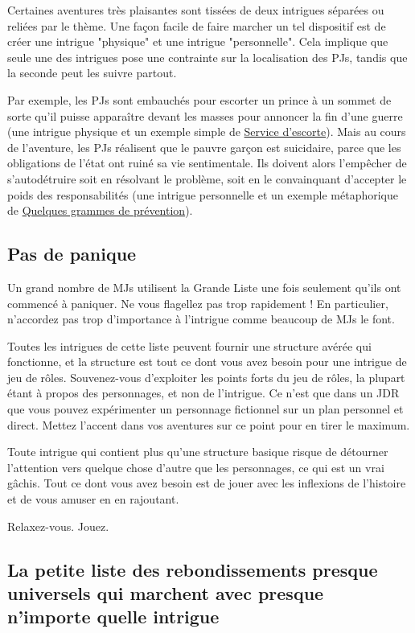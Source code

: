 \begin{multicols}{2}
Certaines aventures très plaisantes sont tissées de deux intrigues séparées ou reliées par le thème. Une façon facile de faire marcher un tel dispositif est de créer une intrigue "physique" et une intrigue "personnelle". Cela implique que seule une des intrigues pose une contrainte sur la localisation des PJs, tandis que la seconde peut les suivre partout.

Par exemple, les PJs sont embauchés pour escorter un prince à un sommet de sorte qu'il puisse apparaître devant les masses pour annoncer la fin d'une guerre (une intrigue physique et un exemple simple de \hyperref[escorte]{Service d'escorte}). Mais au cours de l'aventure, les PJs réalisent que le pauvre garçon est suicidaire, parce que les obligations de l'état ont ruiné sa vie sentimentale. Ils doivent alors l'empêcher de s'autodétruire soit en résolvant le problème, soit en le convainquant d'accepter le poids des responsabilités (une intrigue personnelle et un exemple métaphorique de \hyperref[prevention]{Quelques grammes de prévention}).

\subsection*{Pas de panique}

Un grand nombre de MJs utilisent la Grande Liste une fois seulement qu'ils ont commencé à paniquer. Ne vous flagellez pas trop rapidement ! En particulier, n'accordez pas trop d'importance à l'intrigue comme beaucoup de MJs le font.

Toutes les intrigues de cette liste peuvent fournir une structure avérée qui fonctionne, et la structure est tout ce dont vous avez besoin pour une intrigue de jeu de rôles. Souvenez-vous d'exploiter les points forts du jeu de rôles, la plupart étant à propos des personnages, et non de l'intrigue. Ce n'est que dans un JDR que vous pouvez expérimenter un personnage fictionnel sur un plan personnel et direct. Mettez l'accent dans vos aventures sur ce point pour en tirer le maximum.

Toute intrigue qui contient plus qu'une structure basique risque de détourner l'attention vers quelque chose d'autre que les personnages, ce qui est un vrai gâchis. Tout ce dont vous avez besoin est de jouer avec les inflexions de l'histoire et de vous amuser en en rajoutant.

Relaxez-vous. Jouez.

\subsection*{La petite liste des rebondissements presque universels qui marchent avec presque n'importe quelle intrigue}


\end{multicols}

